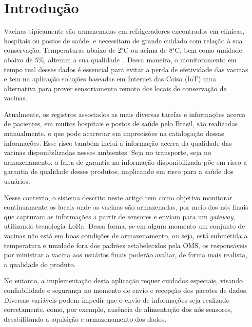\section{Introdução}
    Vacinas tipicamente são armazenadas em refrigeradores encontrados em clínicas, hospitais ou postos de saúde, e necessitam de grande cuidado com relação à sua conservação. Temperaturas abaixo de 2$^\circ$C ou acima de 8$^\circ$C, bem como umidade abaixo de 5\%, alteram a sua qualidade~\cite{ref1}. Dessa maneira, o monitoramento em tempo real desses dados é essencial para evitar a perda de efetividade das vacinas e tem na aplicação soluções baseadas em Internet das Coisa (IoT) uma alternativa para prover sensoriamento remoto dos locais de conservação de vacinas. 
    
    Atualmente, os registros associados as mais diversas tarefas e informações acerca de pacientes, em muitos hospitais e postos de saúde pelo Brasil, são realizadas manualmente, o que pode acarretar em imprecisões na catalogação dessas informações. Esse risco também inclui a informação acerca da qualidade das vacinas disponibilizadas nesses ambientes. Seja no transporte, seja no armazenamento, a falta de garantia na informação disponibilizada põe em risco a garantia de qualidade desses produtos, implicando em risco para a saúde dos usuários.
    
    Nesse contexto, o sistema descrito neste artigo tem como objetivo monitorar continuamente os locais onde as vacinas são armazenadas, por meio dos nós finais que capturam as informações a partir de sensores e enviam para um \textit{gateway}, utilizando tecnologia LoRa. Dessa forma, se em algum momento um conjunto de vacinas não está em boas condições de armazenamento, ou seja, está submetida a temperatura e umidade fora dos padrões estabelecidos pela OMS, os responsáveis por ministrar a vacina aos usuários finais poderão avaliar, de forma mais realista, a qualidade do produto.%
    
    No entanto, a implementação desta aplicação requer cuidados especiais, visando confiabilidade e segurança no momento de envio e recepção dos pacotes de dados.  Diversas variáveis podem impedir que o envio de informações seja realizado corretamente, como, por exemplo, ausência de alimentação dos nós sensores, desabilitando a aquisição e armazenamento dos dados. %
    
